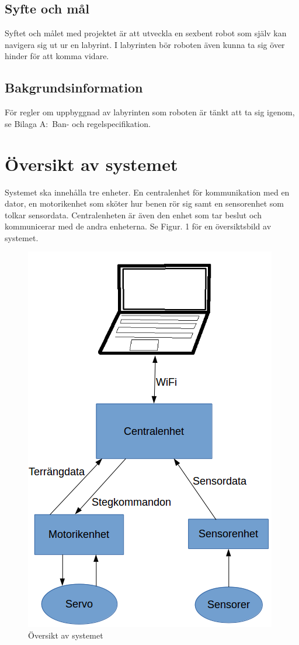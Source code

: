 \documentclass[a4paper,titlepage,12pt]{article}
\begin{document}
	\subsection{Syfte och mål}
	Syftet och målet med projektet är att utveckla en sexbent robot som själv
	kan navigera sig ut ur en labyrint. I labyrinten bör roboten även kunna ta 
	sig över hinder för att komma vidare. 
	\subsection{Bakgrundsinformation}
	För regler om uppbyggnad av labyrinten som roboten är tänkt att ta sig igenom, se
	Bilaga A:\ Ban- och regelspecifikation.


  \newpage
	\section{Översikt av systemet}
	Systemet ska innehålla tre enheter. En centralenhet för kommunikation med en dator, en motorikenhet
	som sköter hur benen rör sig samt en sensorenhet som tolkar sensordata. Centralenheten är även den enhet som
	tar beslut och kommunicerar med de andra enheterna. Se Figur. 1 för en översiktsbild av systemet.
	\begin{figure}[h]
		\centering
		\includegraphics[width=0.5\linewidth]{images/overview.png}
		\caption{Översikt av systemet\label{fig:overview}}
	\end{figure}
\end{document}
